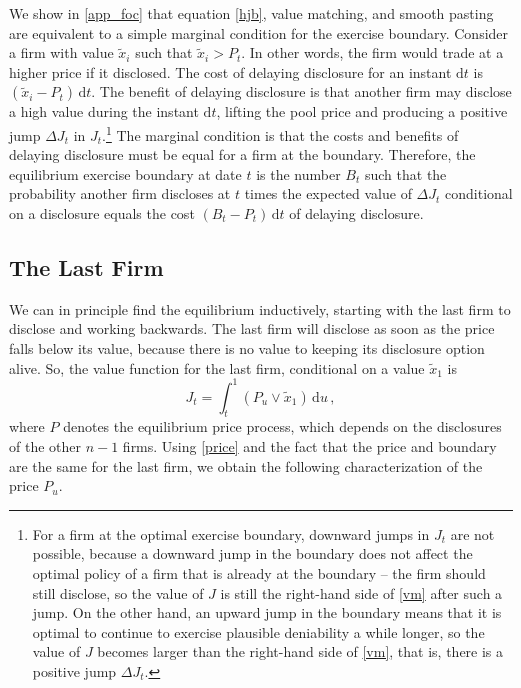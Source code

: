 \documentclass[ecta,nameyear,draft]{econsocart}
\theoremstyle{theorem}
\numberwithin{lemma}{section}
\numberwithin{proposition}{section}
\numberwithin{equation}{section}
\numberwithin{figure}{section}
\newcommand{\D}{\mathrm{d}}
\begin{document}
We show in \ref{app_foc} that equation \eqref{hjb}, value matching, and smooth pasting are equivalent to a simple marginal condition for the exercise boundary.  Consider a firm with value $\tilde x_i$ such that $\tilde x_i > P_t$.  In other words, the firm would trade at a higher price if it disclosed.  The cost of delaying disclosure for an instant $\D t$ is $(\tilde x_i -P_t)\,\D t$.  The benefit of delaying disclosure is that another firm may disclose a high value during the instant $\D t$, lifting the pool price and producing a positive jump $\Delta J_t$ in $J_t$.\footnote{For a firm at the optimal exercise boundary, downward jumps in $J_t$ are not possible, because a  downward jump in the boundary does not affect the optimal policy of a firm that is already at the boundary -- the firm should still disclose, so the value of $J$ is still the right-hand side of \eqref{vm} after such a jump.  On the other hand, an upward jump in the boundary means that it is optimal to continue to exercise plausible deniability a while longer, so the value of $J$ becomes larger than the right-hand side of \eqref{vm}, that is, there is a positive jump $\Delta J_t$.}    The marginal condition is that the costs and benefits of delaying disclosure must be equal for a firm at the boundary.  Therefore, the equilibrium exercise boundary at date $t$ is the number $B_t$ such that the probability another firm discloses at $t$ times the expected value of $\Delta J_t$ conditional on a disclosure equals the cost $(B_t-P_t)\,\D t$ of delaying disclosure.  

\subsection{The Last Firm}

We can in principle find the equilibrium inductively, starting with the last firm to disclose and working backwards.  The last firm will disclose as soon as the price falls below its value, because there is no value to keeping its disclosure option alive.  So, the value function for the last firm, conditional on a value $\tilde x_1$ is
\begin{equation}\label{value:last}
    J_t = \int_t^1 (P_u \vee \tilde x_1)\,\D u\,,
\end{equation}
where $P$ denotes the equilibrium price process, which depends on the disclosures of the other $n-1$ firms.  Using \eqref{price} and the fact that the price and boundary are the same for the last firm, we obtain the following characterization of the price $P_u$.  
\end{document}
